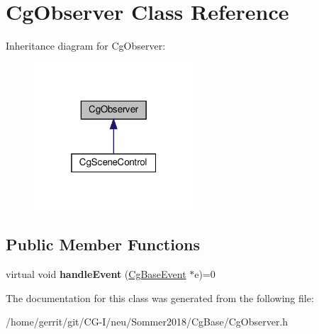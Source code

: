 \hypertarget{class_cg_observer}{}\section{Cg\+Observer Class Reference}
\label{class_cg_observer}


Inheritance diagram for Cg\+Observer\+:
\nopagebreak
\begin{figure}[H]
\begin{center}
\leavevmode
\includegraphics[width=169pt]{class_cg_observer__inherit__graph}
\end{center}
\end{figure}
\subsection*{Public Member Functions}
\begin{DoxyCompactItemize}
\item 
\mbox{\label{class_cg_observer_abc10eee7d31abc762e7390272b75ac3f}} 
virtual void {\bfseries handle\+Event} (\hyperlink{class_cg_base_event}{Cg\+Base\+Event} $\ast$e)=0
\end{DoxyCompactItemize}


The documentation for this class was generated from the following file\+:\begin{DoxyCompactItemize}
\item 
/home/gerrit/git/\+C\+G-\/\+I/neu/\+Sommer2018/\+Cg\+Base/Cg\+Observer.\+h\end{DoxyCompactItemize}
